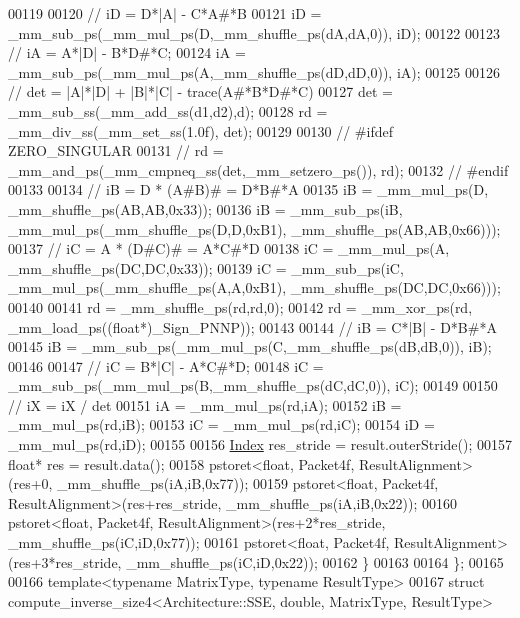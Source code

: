 \begin{DoxyCode}
00119 
00120     \textcolor{comment}{//  iD = D*|A| - C*A#*B}
00121     iD = \_mm\_sub\_ps(\_mm\_mul\_ps(D,\_mm\_shuffle\_ps(dA,dA,0)), iD);
00122 
00123     \textcolor{comment}{//  iA = A*|D| - B*D#*C;}
00124     iA = \_mm\_sub\_ps(\_mm\_mul\_ps(A,\_mm\_shuffle\_ps(dD,dD,0)), iA);
00125 
00126     \textcolor{comment}{//  det = |A|*|D| + |B|*|C| - trace(A#*B*D#*C)}
00127     det = \_mm\_sub\_ss(\_mm\_add\_ss(d1,d2),d);
00128     rd  = \_mm\_div\_ss(\_mm\_set\_ss(1.0f), det);
00129 
00130 \textcolor{comment}{//     #ifdef ZERO\_SINGULAR}
00131 \textcolor{comment}{//         rd = \_mm\_and\_ps(\_mm\_cmpneq\_ss(det,\_mm\_setzero\_ps()), rd);}
00132 \textcolor{comment}{//     #endif}
00133 
00134     \textcolor{comment}{//  iB = D * (A#B)# = D*B#*A}
00135     iB = \_mm\_mul\_ps(D, \_mm\_shuffle\_ps(AB,AB,0x33));
00136     iB = \_mm\_sub\_ps(iB, \_mm\_mul\_ps(\_mm\_shuffle\_ps(D,D,0xB1), \_mm\_shuffle\_ps(AB,AB,0x66)));
00137     \textcolor{comment}{//  iC = A * (D#C)# = A*C#*D}
00138     iC = \_mm\_mul\_ps(A, \_mm\_shuffle\_ps(DC,DC,0x33));
00139     iC = \_mm\_sub\_ps(iC, \_mm\_mul\_ps(\_mm\_shuffle\_ps(A,A,0xB1), \_mm\_shuffle\_ps(DC,DC,0x66)));
00140 
00141     rd = \_mm\_shuffle\_ps(rd,rd,0);
00142     rd = \_mm\_xor\_ps(rd, \_mm\_load\_ps((\textcolor{keywordtype}{float}*)\_Sign\_PNNP));
00143 
00144     \textcolor{comment}{//  iB = C*|B| - D*B#*A}
00145     iB = \_mm\_sub\_ps(\_mm\_mul\_ps(C,\_mm\_shuffle\_ps(dB,dB,0)), iB);
00146 
00147     \textcolor{comment}{//  iC = B*|C| - A*C#*D;}
00148     iC = \_mm\_sub\_ps(\_mm\_mul\_ps(B,\_mm\_shuffle\_ps(dC,dC,0)), iC);
00149 
00150     \textcolor{comment}{//  iX = iX / det}
00151     iA = \_mm\_mul\_ps(rd,iA);
00152     iB = \_mm\_mul\_ps(rd,iB);
00153     iC = \_mm\_mul\_ps(rd,iC);
00154     iD = \_mm\_mul\_ps(rd,iD);
00155 
00156     \hyperlink{namespace_eigen_a62e77e0933482dafde8fe197d9a2cfde}{Index} res\_stride = result.outerStride();
00157     \textcolor{keywordtype}{float}* res = result.data();
00158     pstoret<float, Packet4f, ResultAlignment>(res+0,            \_mm\_shuffle\_ps(iA,iB,0x77));
00159     pstoret<float, Packet4f, ResultAlignment>(res+res\_stride,   \_mm\_shuffle\_ps(iA,iB,0x22));
00160     pstoret<float, Packet4f, ResultAlignment>(res+2*res\_stride, \_mm\_shuffle\_ps(iC,iD,0x77));
00161     pstoret<float, Packet4f, ResultAlignment>(res+3*res\_stride, \_mm\_shuffle\_ps(iC,iD,0x22));
00162   \}
00163 
00164 \};
00165 
00166 \textcolor{keyword}{template}<\textcolor{keyword}{typename} MatrixType, \textcolor{keyword}{typename} ResultType>
00167 \textcolor{keyword}{struct }compute\_inverse\_size4<Architecture::SSE, double, MatrixType, ResultType>

\end{DoxyCode}
